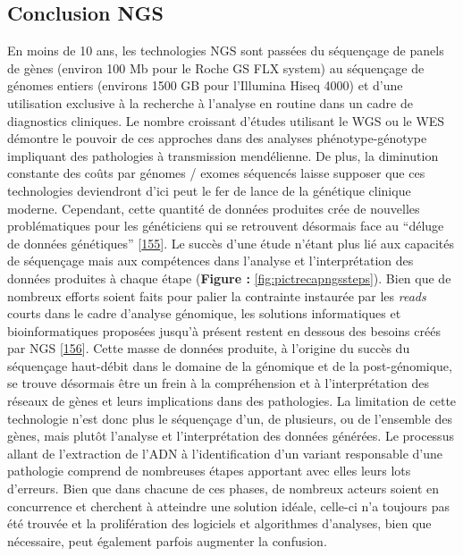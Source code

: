 \documentclass[12pt,twoside]{reedthesis}
\theoremstyle{definition}
\theoremstyle{definition}
\theoremstyle{remark}
\begin{document}
  \newpage
  
  \subsection{Conclusion NGS}\label{conclusion-ngs}
  
  En moins de 10 ans, les technologies NGS sont passées du séquençage de
  panels de gènes (environ 100 Mb pour le Roche GS FLX system) au
  séquençage de génomes entiers (environs 1500 GB pour l'Illumina Hiseq
  4000) et d'une utilisation exclusive à la recherche à l'analyse en
  routine dans un cadre de diagnostics cliniques. Le nombre croissant
  d'études utilisant le WGS ou le WES démontre le pouvoir de ces approches
  dans des analyses phénotype-génotype impliquant des pathologies à
  transmission mendélienne. De plus, la diminution constante des coûts par
  génomes / exomes séquencés laisse supposer que ces technologies
  deviendront d'ici peut le fer de lance de la génétique clinique moderne.
  Cependant, cette quantité de données produites crée de nouvelles
  problématiques pour les généticiens qui se retrouvent désormais face au
  ``déluge de données génétiques''
  {[}\protect\hyperlink{ref-Schatz2013}{155}{]}. Le succès d'une étude
  n'étant plus lié aux capacités de séquençage mais aux compétences dans
  l'analyse et l'interprétation des données produites à chaque étape
  (\textbf{Figure :} \ref{fig:pictrecapngssteps}). Bien que de nombreux
  efforts soient faits pour palier la contrainte instaurée par les
  \emph{reads} courts dans le cadre d'analyse génomique, les solutions
  informatiques et bioinformatiques proposées jusqu'à présent restent en
  dessous des besoins créés par NGS
  {[}\protect\hyperlink{ref-McPherson2009}{156}{]}. Cette masse de données
  produite, à l'origine du succès du séquençage haut-débit dans le domaine
  de la génomique et de la post-génomique, se trouve désormais être un
  frein à la compréhension et à l'interprétation des réseaux de gènes et
  leurs implications dans des pathologies. La limitation de cette
  technologie n'est donc plus le séquençage d'un, de plusieurs, ou de
  l'ensemble des gènes, mais plutôt l'analyse et l'interprétation des
  données générées. Le processus allant de l'extraction de l'ADN à
  l'identification d'un variant responsable d'une pathologie comprend de
  nombreuses étapes apportant avec elles leurs lots d'erreurs. Bien que
  dans chacune de ces phases, de nombreux acteurs soient en concurrence et
  cherchent à atteindre une solution idéale, celle-ci n'a toujours pas été
  trouvée et la prolifération des logiciels et algorithmes d'analyses,
  bien que nécessaire, peut également parfois augmenter la confusion.
  
\end{document}
